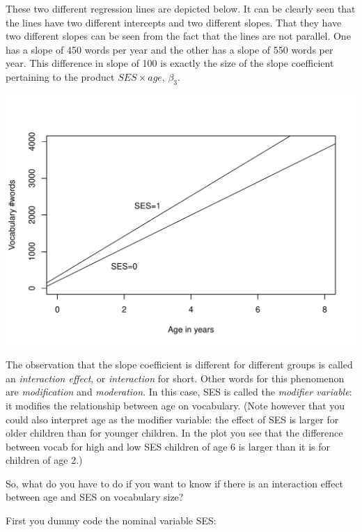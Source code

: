 \documentclass[]{report}\usepackage[]{graphicx}\usepackage[]{color}
\makeatletter
\def\maxwidth{ %
  \ifdim\Gin@nat@width>\linewidth
    \linewidth
  \else
    \Gin@nat@width
  \fi
}
\newenvironment{knitrout}{}{} %
\makeatother
\begin{document}
These two different regression lines are depicted below. It can be clearly seen that the lines have two different intercepts and two different slopes. That they have two different slopes can be seen from the fact that the lines are not parallel. One has a slope of 450 words per year and the other has a slope of 550 words per year. This difference in slope of 100 is exactly the size of the slope coefficient pertaining to the product $SES \times age$, $\beta_3$. 

\begin{knitrout}
\color{fgcolor}
\includegraphics[width=\maxwidth]{figure/summary_plot-1} 

\end{knitrout}


The observation that the slope coefficient is different for different groups is called an \textit{interaction effect}, or \textit{interaction} for short. Other words for this phenomenon are \textit{modification} and \textit{moderation}. In this case, SES is called the \textit{modifier variable}: it modifies the relationship between age on vocabulary. (Note however that you could also interpret age as the modifier variable: the effect of SES is larger for older children than for younger children. In the plot you see that the difference between vocab for high and low SES children of age 6 is larger than it is for children of age 2.)

So, what do you have to do if you want to know if there is an interaction effect between age and SES on vocabulary size? 

First you dummy code the nominal variable SES: 
\end{document}
